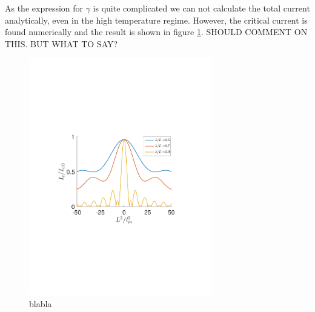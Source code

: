 As the expression for $\gamma$ is quite complicated we can not calculate the total current analytically, even in the high temperature regime. However, the critical current is found numerically and the result is shown in figure \ref{fig:Critical2}. SHOULD COMMENT ON THIS. BUT WHAT TO SAY?
\begin{figure}[hhh]
\centering
\includegraphics[width=8cm,clip=true,trim=3cm 8cm 4cm 9cm]{fig/Critical2}
\caption{blabla}
\label{fig:Critical2}
\end{figure}


